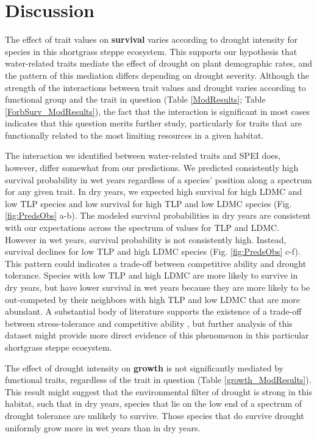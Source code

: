 \documentclass[12pt, letterpaper]{article}
\begin{document}
\section{Discussion}
The effect of trait values on \textbf{survival} varies according to drought intensity for species in this shortgrass steppe ecosystem. This supports our hypothesis that water-related traits mediate the effect of drought on plant demographic rates, and the pattern of this mediation differs depending on drought severity. Although the strength of the interactions between trait values and drought varies according to functional group and the trait in question (Table \ref{ModResults}; Table \ref{ForbSurv_ModResults}), the fact that the interaction is significant in most cases indicates that this question merits further study, particularly for traits that are functionally related to the most limiting resources in a given habitat. 

The interaction we identified between water-related traits and SPEI does, however, differ somewhat from our predictions. We predicted consistently high survival probability in wet years regardless of a species' position along a spectrum for any given trait. In dry years, we expected high survival for high LDMC and low TLP species and low survival for high TLP and low LDMC species (Fig. \ref{fig:PredsObs} a-b). The modeled survival probabilities in dry years are consistent with our expectations across the spectrum of values for TLP and LDMC. However in wet years, survival probability is not consistently high. Instead, survival declines for low TLP and high LDMC species (Fig. \ref{fig:PredsObs} c-f). This pattern could indicates a trade-off between competitive ability and drought tolerance. Species with low TLP and high LDMC are more likely to survive in dry years, but have lower survival in wet years because they are more likely to be out-competed by their neighbors with high TLP and low LDMC that are more abundant. A substantial body of literature supports the existence of a trade-off between stress-tolerance and competitive ability \citep{Grime1979, Grime1997, Craine2007, Volaire2018}, but further analysis of this dataset might provide more direct evidence of this phenomenon in this particular shortgrass steppe ecosystem. 

The effect of drought intensity on \textbf{growth} is not significantly mediated by functional traits, regardless of the trait in question (Table \ref{growth_ModResults}). This result might suggest that the environmental filter \citep{HilleRisLambers2012} of drought is strong in this habitat, such that in dry years, species that lie on the low end of a spectrum of drought tolerance are unlikely to survive. Those species that do survive drought uniformly grow more in wet years than in dry years.   
\end{document}
